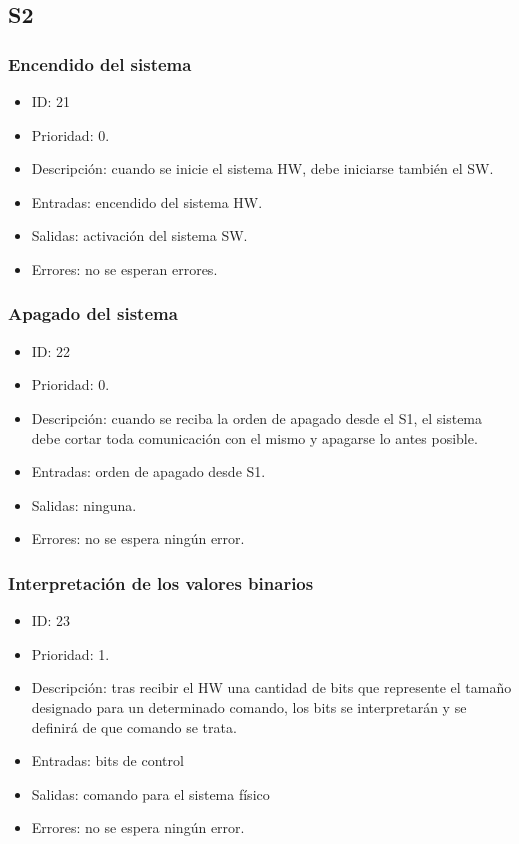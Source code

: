 \subsection*{\ac{S2}} 
\subsubsection{Encendido del sistema}
\begin{itemize}
    \item ID: 21
    \item Prioridad: 0.
    \item Descripción: cuando se inicie el sistema \ac{HW}, debe iniciarse también el \ac{SW}.
    \item Entradas: encendido del sistema \ac{HW}.
    \item Salidas: activación del sistema \ac{SW}.
    \item Errores: no se esperan errores.
\end{itemize}

\subsubsection{Apagado del sistema}
\begin{itemize}
    \item ID: 22
    \item Prioridad: 0.
    \item Descripción: cuando se reciba la orden de apagado desde el \ac{S1}, el sistema debe cortar toda comunicación con el mismo y apagarse lo antes posible.
    \item Entradas: orden de apagado desde \ac{S1}.
    \item Salidas: ninguna.
    \item Errores: no se espera ningún error.
\end{itemize}

\subsubsection{Interpretación de los valores binarios}
\begin{itemize}
    \item ID: 23
    \item Prioridad: 1.
    \item Descripción: tras recibir el \ac{HW} una cantidad de bits que represente el tamaño designado para un determinado comando, los bits se interpretarán y se definirá de que comando se trata.
    \item Entradas: bits de control
    \item Salidas: comando para el sistema físico
    \item Errores: no se espera ningún error.
\end{itemize}

